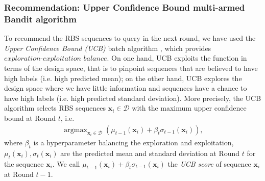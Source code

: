
\subsubsection{Recommendation: Upper Confidence Bound multi-armed Bandit algorithm}

To recommend the RBS sequences to query in the next round, we have used the \textit{Upper Confidence Bound (UCB)} batch algorithm
\cite{lattimore2020bandit}
, which provides  $\textit{exploration-exploitation balance}$.
On one hand, UCB exploits the function in terms of the design space, that is to pinpoint sequences that are believed to have high labels (i.e. high predicted mean); 
on the other hand, UCB explores the design space where we have little information and sequences have a chance to have high labels (i.e. high predicted standard deviation).
More precisely, the UCB algorithm selects RBS sequences $\mathbf{x}_i \in \mathcal{D}$ with the maximum upper confidence bound at Round $t$, i.e.
\begin{align}
\label{Eq: GPUCB}
    \operatorname{argmax}_{\mathbf{x}_i \in \mathcal{D}} \left( \mu_{t-1}(\mathbf{x}_i) + \beta_t \sigma_{t-1}(\mathbf{x}_i)\right),
\end{align}
where $\beta_t$ is a hyperparameter balancing the exploration and exploitation, 
$\mu_t(\mathbf{x}_i), \sigma_t(\mathbf{x}_i)$ are the predicted mean and standard deviation at Round $t$ for the sequence $\mathbf{x}_i$.
We call $\mu_{t-1}(\mathbf{x}_i) + \beta_t \sigma_{t-1}(\mathbf{x}_i)$ the \textit{UCB score} of sequence $\mathbf{x}_i$ at Round $t-1$.\\

